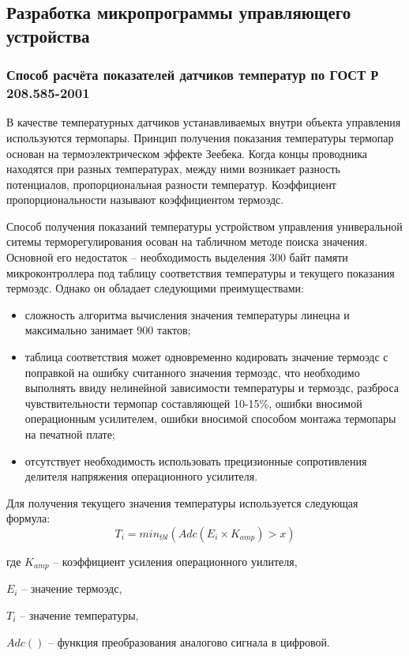 \subsection{Разработка микропрограммы управляющего устройства}

\subsubsection{Способ расчёта показателей датчиков температур по
ГОСТ Р 208.585-2001}
В качестве температурных датчиков устанавливаемых внутри объекта управления используются
термопары. Принцип получения показания температуры термопар основан на
термоэлектрическом эффекте Зеебека. Когда концы проводника находятся при разных температурах,
между ними возникает разность потенциалов, пропорциональная разности температур.
Коэффициент пропорциональности называют коэффициентом термоэдс.

Способ получения показаний температуры устройством управления универальной
ситемы терморегулирования осован на табличном методе поиска значения.
Основной его недостаток -- необходимость выделения 300 байт памяти микроконтроллера под
таблицу соответствия температуры и текущего показания термоэдс.
Однако он обладает следующими преимуществами:
\begin{itemize}
	\item{} сложность алгоритма вычисления значения температуры линецна и максимально занимает
		900 тактов;
	\item{} таблица соответствия может одновременно кодировать значение термоэдс с поправкой на
		ошибку считанного значения термоэдс, что необходимо выполнять ввиду нелинейной зависимости
		температуры и термоэдс, разброса чувствительности термопар составляющей 10-15\%, ошибки
		вносимой операционным усилителем, ошибки вносимой способом монтажа термопары на печатной плате;
	\item{} отсутствует необходимость использовать прецизионные сопротивления делителя
		напряжения операционного усилителя.
\end{itemize}

Для получения текущего значения температуры используется следующая формула:
\begin{equation}
	T_i = min_{tbl}(Adc(E_i \times{} K_{amp}) > x) 
\end{equation}
\begin{ESKDexplanation}
	\item[где ]{} $K_{amp}$ -- коэффициент усиления операционного уилителя,
	\item{} $E_i$ -- значение термоэдс,
	\item{} $T_i$ -- значение температуры,
	\item{} $Adc()$ -- функция преобразования аналогово сигнала в цифровой.
\end{ESKDexplanation}


